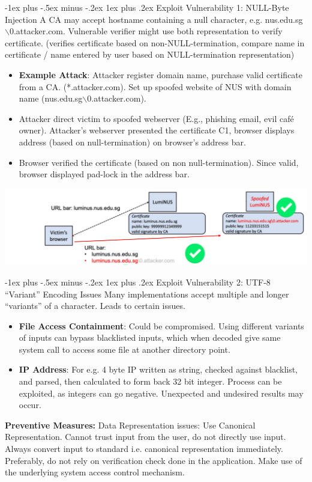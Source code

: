 \documentclass[10pt, landscape]{article}
\makeatletter
\renewcommand{\subsubsection}{\@startsection{subsubsection}{3}{0mm}%
                                {-1ex plus -.5ex minus -.2ex}%
                                {1ex plus .2ex}%
                                {\normalfont\small\bfseries}}
\makeatother
\begin{document}
\begin{multicols*}{3}
\subsubsection{Exploit Vulnerability 1: NULL-Byte Injection}
A CA may accept hostname containing a null character, e.g. nus.edu.sg$\backslash$0.attacker.com. Vulnerable verifier might use both representation to verify certificate. (verifies certificate based on non-NULL-termination, compare name in certificate / name entered by user based on NULL-termination representation)
\begin{itemize}
\item \textbf{Example Attack}: Attacker register domain name, purchase valid certificate from a CA.  (*.attacker.com). Set up spoofed website of NUS with domain name (nus.edu.sg$\backslash$0.attacker.com). 
\item Attacker direct victim to spoofed webserver (E.g., phishing email, evil café owner). Attacker’s webserver presented the certificate C1, browser displays address (based on null-termination) on browser’s address bar. 
\item Browser verified the certificate (based on non null-termination). Since valid, browser displayed pad-lock in the address bar.
\end{itemize}
\centerline{\includegraphics[width=0.8\linewidth]{nullByteAddress}}

\subsubsection{Exploit Vulnerability 2: UTF-8 “Variant” Encoding Issues}
Many implementations accept multiple and longer “variants” of a character. Leads to certain issues.
\begin{itemize}
\item \textbf{File Access Containment}: Could be compromised. Using different variants of inputs can bypass blacklisted inputs, which when decoded give same system call to access some file at another directory point.
\item \textbf{IP Address}: For e.g. 4 byte IP written as string, checked against blacklist, and parsed, then calculated to form back 32 bit integer. Process can be exploited, as integers can go negative. Unexpected and undesired results may occur. 
\end{itemize}
\textbf{Preventive Measures:} Data Representation issues: Use Canonical Representation. Cannot trust input from the user, do not directly 
use input. Always convert input to standard i.e. canonical representation immediately. Preferably, do not rely on verification check done in the application. Make use of the underlying system access control mechanism.


\end{multicols*}
\end{document}

